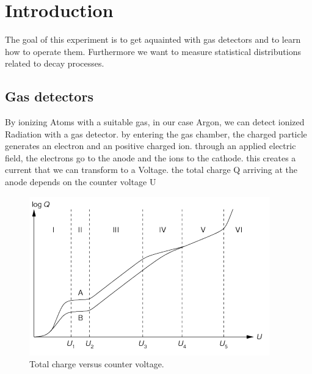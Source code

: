 {}
\thispagestyle{plain}

\tableofcontents
\newpage
\listoffigures

\listoftables

\skippage

\setcounter{page}{1}
\restoregeometry
\thispagestyle{fancy}


\section{Introduction}

The goal of this experiment is to get aquainted with gas detectors and to learn how to operate them. Furthermore we want to measure statistical distributions related to decay processes.

\subsection{Gas detectors}


By ionizing Atoms with a suitable gas, in our case Argon, we can detect ionized Radiation with a gas detector.
by entering the gas chamber, the charged particle generates an electron and an positive charged ion.
through an applied electric field, the electrons go to the anode and the ions to the cathode. this creates a current
that we can transform to a Voltage.
the total charge Q arriving at the anode depends on the counter voltage U 

\begin{figure}[H]
\centering
\includegraphics[width=\textwidth]{../Figures/total.PNG}
\caption{Total charge versus counter voltage.}
\label{fig:Total}
\end{figure}

